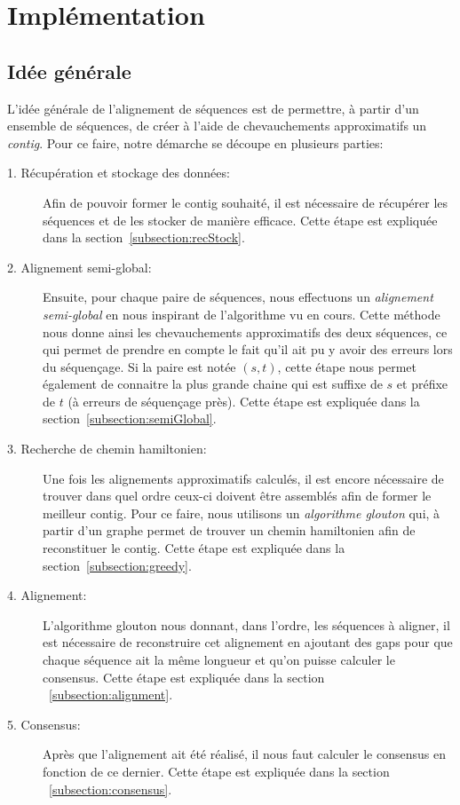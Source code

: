 \section{Implémentation}

\subsection{Idée générale}

	L'idée générale de l'alignement de séquences est de permettre, à partir d'un ensemble de séquences, de créer à l'aide de chevauchements approximatifs un \emph{contig}. Pour ce faire, notre démarche se découpe en plusieurs parties:

	\begin{description}
		\item[1. Récupération et stockage des données:] Afin de pouvoir former le contig souhaité, il est nécessaire de récupérer les séquences et de les stocker de manière efficace. Cette étape est expliquée dans la section~\ref{subsection:recStock}.

		\item[2. Alignement semi-global:] Ensuite, pour chaque paire de séquences,
			nous effectuons un \emph{alignement semi-global} en nous inspirant
			de l'algorithme vu en cours. Cette méthode nous donne ainsi
			les chevauchements approximatifs des deux séquences, ce qui permet de
			prendre en compte le fait qu'il ait pu y avoir des erreurs lors du
			séquençage. Si la paire est notée $(s, t)$, cette étape nous permet également de connaitre la plus
			grande chaine qui est suffixe de $s$ et préfixe de $t$ (à erreurs de séquençage près). Cette étape
			est expliquée dans la section~\ref{subsection:semiGlobal}.

		\item[3. Recherche de chemin hamiltonien:] Une fois les alignements approximatifs
			calculés, il est encore nécessaire de trouver dans quel ordre
			ceux-ci doivent être assemblés afin de former le meilleur contig.
			Pour ce faire, nous utilisons un \emph{algorithme glouton} qui, à
			partir d'un graphe permet de trouver un chemin hamiltonien afin de
			reconstituer le contig. Cette étape est expliquée dans la
			section~\ref{subsection:greedy}.

		\item[4. Alignement:]
			L'algorithme glouton nous donnant, dans l'ordre, les séquences à
			aligner, il est nécessaire de reconstruire cet alignement en
			ajoutant des gaps pour que chaque séquence ait la même longueur et
			qu'on puisse calculer le consensus. Cette étape est expliquée dans
			la section ~\ref{subsection:alignment}.

		\item[5. Consensus:]
			Après que l'alignement ait été réalisé, il nous faut calculer le
			consensus en fonction de ce dernier. Cette étape est expliquée dans
			la section ~\ref{subsection:consensus}.
	\end{description}

